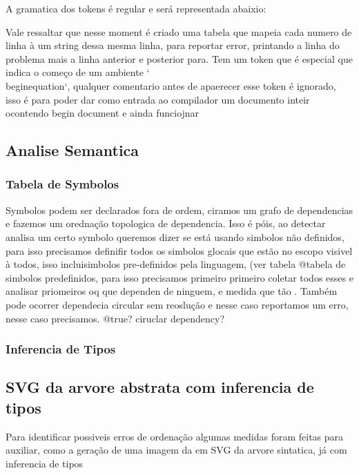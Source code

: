A gramatica dos tokens é regular e será representada abaixio:


Vale ressaltar que nesse moment é criado uma tabela que mapeia cada numero de linha à um string dessa mesma linha, para reportar error, printando a linha do problema mais a linha anterior e posterior para.
Tem um token que é especial que indica o começo de um ambiente `\\begin{equation}`, qualquer comentario antes de apaerecer esse token é ignorado, isso é para poder dar como entrada ao compilador um documento inteir ocontendo begin document e ainda funciojnar



\subsection{Analise Semantica}

\subsubsection{Tabela de Symbolos}
Symbolos podem ser declarados fora de ordem, ciramos um grafo de dependencias e fazemos um orednação topologica de dependencia.
Isso é póis, ao detectar analisa um certo symbolo queremos dizer se está usando simbolos não definidos, para isso precisamos definifir todos os simbolos glocais que estão no escopo visivel à todos, isso incluisimbolos pre-definidos pela linguagem, (ver tabela @{tabela de simbolos predefinidos}, para isso precisamos primeiro primeiro coletar todos esses e analisar priomeiros oq que dependen de ninguem, e medida que tão
. Também pode ocorrer dependecia circular sem reoslução e nesse caso reportamos um erro, nesse caso precisamos. @{true? ciruclar dependency?}

\subsubsection{Inferencia de Tipos}

\subsection{SVG da arvore abstrata com inferencia de tipos}
Para identificar possiveis erros de ordenação algumas medidas foram feitas para auxiliar, como a geração de uma imagem da 
em SVG da arvore sintatica, já com inferencia de tipos


